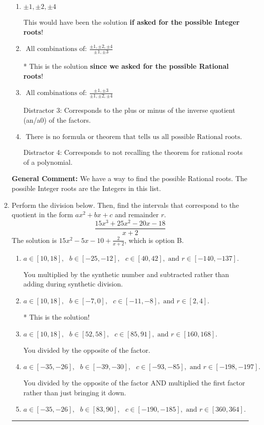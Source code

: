 \documentclass{extbook}[14pt]
\newcommand{\litem}[1]{\item #1

\rule{\textwidth}{0.4pt}}
\begin{document}
\begin{enumerate}
{\begin{enumerate}[label=\Alph*.]
 Distractor 1: Corresponds to the plus or minus factors of a1 only.
\item \( \pm 1,\pm 2,\pm 4 \)

This would have been the solution \textbf{if asked for the possible Integer roots}!
\item \( \text{ All combinations of: }\frac{\pm 1,\pm 2,\pm 4}{\pm 1,\pm 3} \)

* This is the solution \textbf{since we asked for the possible Rational roots}!
\item \( \text{ All combinations of: }\frac{\pm 1,\pm 3}{\pm 1,\pm 2,\pm 4} \)

 Distractor 3: Corresponds to the plus or minus of the inverse quotient (an/a0) of the factors. 
\item \( \text{ There is no formula or theorem that tells us all possible Rational roots.} \)

 Distractor 4: Corresponds to not recalling the theorem for rational roots of a polynomial.
\end{enumerate}

\textbf{General Comment:} We have a way to find the possible Rational roots. The possible Integer roots are the Integers in this list.
}
\litem{
Perform the division below. Then, find the intervals that correspond to the quotient in the form $ax^2+bx+c$ and remainder $r$.
\[ \frac{15x^{3} +25 x^{2} -20 x -18}{x + 2} \]The solution is \( 15x^{2} -5 x -10 + \frac{2}{x + 2} \), which is option B.\begin{enumerate}[label=\Alph*.]
\item \( a \in [10, 18], \text{   } b \in [-25, -12], \text{   } c \in [40, 42], \text{   and   } r \in [-140, -137]. \)

 You multiplied by the synthetic number and subtracted rather than adding during synthetic division.
\item \( a \in [10, 18], \text{   } b \in [-7, 0], \text{   } c \in [-11, -8], \text{   and   } r \in [2, 4]. \)

* This is the solution!
\item \( a \in [10, 18], \text{   } b \in [52, 58], \text{   } c \in [85, 91], \text{   and   } r \in [160, 168]. \)

 You divided by the opposite of the factor.
\item \( a \in [-35, -26], \text{   } b \in [-39, -30], \text{   } c \in [-93, -85], \text{   and   } r \in [-198, -197]. \)

 You divided by the opposite of the factor AND multiplied the first factor rather than just bringing it down.
\item \( a \in [-35, -26], \text{   } b \in [83, 90], \text{   } c \in [-190, -185], \text{   and   } r \in [360, 364]. \)


\end{enumerate}}
\end{enumerate}
\end{document}
